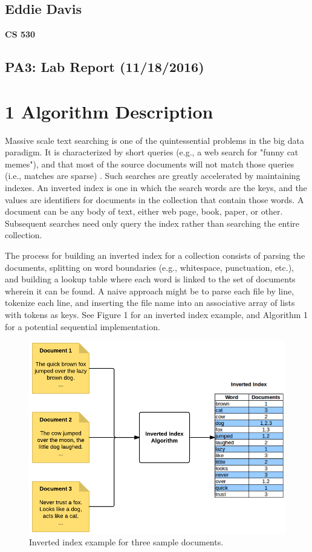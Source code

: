 \documentclass{bsu-ms}
\begin{document}
\subsection*{Eddie Davis}
\textbf{CS 530}\\
\subsection*{PA3: Lab Report (11/18/2016)}

\section*{1 Algorithm Description}

Massive scale text searching is one of the quintessential problems in the big data paradigm. It is characterized by short queries (e.g., a web search for "funny cat memes"), and that most of the source documents will not match those queries (i.e., matches are sparse) . Such searches are greatly accelerated by maintaining indexes. An inverted index is one in which the search words are the keys, and the values are identifiers for documents in the collection that contain those words. A document can be any body of text, either web page, book, paper, or other. Subsequent searches need only query the index rather than searching the entire collection.

The process for building an inverted index for a collection consists of parsing the documents, splitting on word boundaries (e.g., whitespace, punctuation, etc.), and building a lookup table where each word is linked to the set of documents wherein it can be found. A naive approach might be to parse each file by line, tokenize each line, and inserting the file name into an associative array of lists with tokens as keys. See Figure 1 for an inverted index example, and Algorithm 1 for a potential sequential implementation.

\begin{figure}[ht]
	\begin{center}
		\includegraphics[scale=.6,keepaspectratio]{invertedindex.png}
	\end{center}
	\caption{Inverted index example for three sample documents.}
	\label{fig:fig1}
\end{figure}
\end{document}
